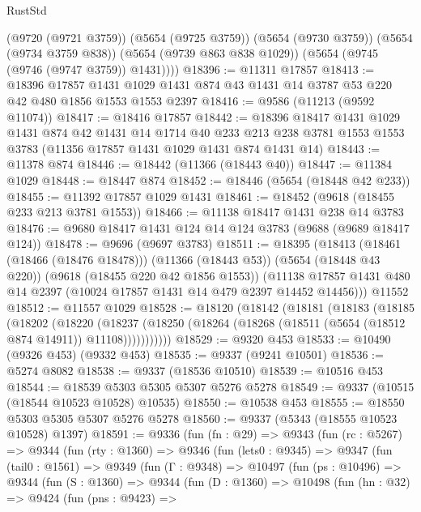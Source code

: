 \begin{lexlean}{RustStd}
\begin{coremodule}
        (@9720 (@9721 @3759))
        (@5654 (@9725 @3759))
        (@5654 (@9730 @3759))
        (@5654 (@9734 @3759 @838))
        (@5654 (@9739 @863 @838 @1029))
        (@5654 (@9745 (@9746 (@9747 @3759)) @1431))))
@18396 := @11311 @17857
@18413 := @18396
    @17857
    @1431
    @1029
    @1431
    @874
    @43
    @1431
    @14
    @3787
    @53
    @220
    @42
    @480
    @1856
    @1553
    @1553
    @2397
@18416 := @9586 (@11213 (@9592 @11074))
@18417 := @18416 @17857
@18442 := @18396
    @18417
    @1431
    @1029
    @1431
    @874
    @42
    @1431
    @14
    @1714
    @40
    @233
    @213
    @238
    @3781
    @1553
    @1553
    @3783
    (@11356 @17857 @1431 @1029 @1431 @874 @1431 @14)
@18443 := @11378 @874
@18446 := @18442 (@11366 (@18443 @40))
@18447 := @11384 @1029
@18448 := @18447 @874
@18452 := @18446 (@5654 (@18448 @42 @233))
@18455 := @11392 @17857 @1029 @1431
@18461 := @18452 (@9618 (@18455 @233 @213 @3781 @1553))
@18466 := @11138 @18417 @1431 @238 @14 @3783
@18476 := @9680 @18417 @1431 @124 @14 @124 @3783 (@9688 (@9689 @18417 @124))
@18478 := @9696 (@9697 @3783)
@18511 := @18395
    (@18413
      (@18461 (@18466 (@18476 @18478)))
      (@11366 (@18443 @53))
      (@5654 (@18448 @43 @220))
      (@9618 (@18455 @220 @42 @1856 @1553))
      (@11138 @17857 @1431 @480 @14 @2397 (@10024 @17857 @1431 @14 @479 @2397 @14452 @14456)))
    @11552
@18512 := @11557 @1029
@18528 := @18120
    (@18142
      (@18181
        (@18183
          (@18185
            (@18202
              (@18220
                (@18237
                  (@18250 (@18264 (@18268 (@18511 (@5654 (@18512 @874 @14911)) @11108)))))))))))
@18529 := @9320 @453
@18533 := @10490 (@9326 @453) (@9332 @453)
@18535 := @9337 (@9241 @10501)
@18536 := @5274 @8082
@18538 := @9337 (@18536 @10510)
@18539 := @10516 @453
@18544 := @18539 @5303 @5305 @5307 @5276 @5278
@18549 := @9337 (@10515 (@18544 @10523 @10528) @10535)
@18550 := @10538 @453
@18555 := @18550 @5303 @5305 @5307 @5276 @5278
@18560 := @9337 (@5343 (@18555 @10523 @10528) @1397)
@18591 := @9336
    (fun (fn : @29) =>
    @9343
      (fun (rc : @5267) =>
      @9344
        (fun (rty : @1360) =>
        @9346
          (fun (lets0 : @9345) =>
          @9347
            (fun (tail0 : @1561) =>
            @9349
              (fun (Γ : @9348) =>
              @10497
                (fun (ps : @10496) =>
                @9344
                  (fun (S : @1360) =>
                  @9344
                    (fun (D : @1360) =>
                    @10498
                      (fun (hn : @32) =>
                      @9424
                        (fun (pns : @9423) =>

\end{coremodule}
\end{lexlean}
